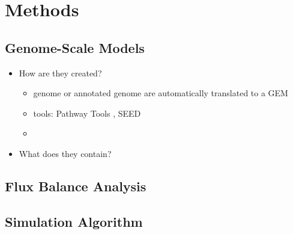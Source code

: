 \section{Methods}\label{sec:methods}

\subsection{Genome-Scale Models}\label{ssec:genome_scale_models}

\begin{itemize}
 \item How are they created?
 \begin{itemize}
  \item genome or annotated genome are automatically translated to a GEM
  \item tools: Pathway Tools \cite{karp2009pathway}, SEED \cite{henry2010high}
  \item \cite{santos_practical_2011}
 \end{itemize}

 \item What does they contain?
\end{itemize}


\subsection{Flux Balance Analysis}\label{ssec:flux_balance_analysis}

\subsection{Simulation Algorithm}

